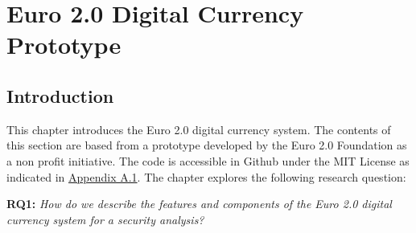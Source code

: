 \documentclass[a4paper,12pt]{article} %
\begin{document}
\pagebreak

\section{Euro 2.0 Digital Currency Prototype} \label{sec:3}

\subsection{Introduction} \label{ssec:3.1}
This chapter introduces the Euro 2.0 digital currency system. The contents of this section are based from a prototype developed by the Euro 2.0 Foundation as a non profit initiative. The code is accessible in Github under the MIT License as indicated in \hyperref[ssec:a.1]{Appendix A.1}. The chapter explores the following research question:

\begin{quoting}
\textbf{RQ1:} \textit{How do we describe the features and components of the Euro 2.0 digital currency system for a security analysis?}
\end{quoting}
\end{document}
